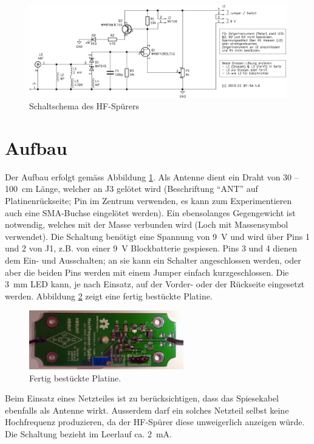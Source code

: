 \documentclass[a4paper,11pt,halfparskip,smallheadings,DIV=10]{scrartcl}
\begin{document}
\begin{figure}
\includegraphics[width=\textwidth]{schaltung.pdf}
\caption{Schaltschema des HF-Spürers}
\label{fig:schematic}
\end{figure}

\section{Aufbau}
Der Aufbau erfolgt gemäss Abbildung \ref{fig:schematic}. Als Antenne dient ein
Draht von 30 -- 100~cm Länge, welcher an J3 gelötet wird (Beschriftung ``ANT''
auf Platinenrückseite; Pin im Zentrum verwenden, es kann zum Experimentieren
auch eine SMA-Buchse eingelötet werden).
Ein ebensolanges Gegengewicht ist notwendig, welches mit der Masse
verbunden wird (Loch mit Massensymbol verwendet). Die Schaltung benötigt eine Spannung von
9~V und wird über Pins 1 und 2 von J1, z.B. von einer 9~V Blockbatterie
gespiesen. Pins 3 und 4 dienen dem Ein- und Ausschalten; an sie kann ein Schalter
angeschlossen werden, oder aber die beiden Pins werden mit einem Jumper einfach
kurzgeschlossen. Die 3~mm LED kann, je nach Einsatz, auf der Vorder- oder der
Rückseite eingesetzt werden.  Abbildung \ref{fig:aufbau} zeigt eine fertig
bestückte Platine.

\begin{figure}[H]
    \begin{center}\includegraphics[width=0.6\textwidth]{foto.png}\end{center}
\caption{Fertig bestückte Platine.}
\label{fig:aufbau}
\end{figure}

Beim Einsatz eines
Netzteiles ist zu berücksichtigen, dass das Spiesekabel ebenfalls als Antenne
wirkt. Ausserdem darf ein solches Netzteil selbst keine Hochfrequenz produzieren,
da der HF-Spürer diese unweigerlich anzeigen würde.  Die Schaltung bezieht im
Leerlauf ca. 2~mA.
\end{document}

